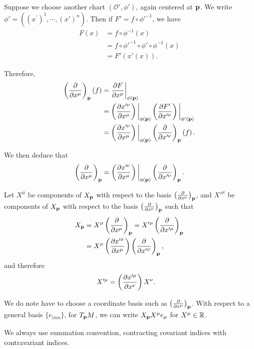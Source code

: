 Suppose we choose another chart $\left( \mathcal{O}', \phi' \right) $, again centered at $\vb{p}$. We write $\phi' = \left(\left( x^{'} \right)^{1}, \cdots, \left( x' \right)^{n}   \right) $. Then if $F' = f \circ \phi'^{-1}$, we have
\begin{align}
    F \left( x \right) &= f \circ \phi^{-1}\left( x \right) \\
    &= f \circ \phi'^{-1} \circ \phi'\circ \phi^{-1} \left( x \right) \\
    &= F' \left( x' \left( x \right)  \right)
.\end{align}

Therefore,
\begin{align}
    \left( \pdv{x^{\mu}} \right)_{\vb{p}} \left( f \right) &=  \pdv{F}{x^{\mu}} \bigg|_{\phi \left( \vb{p} \right) }\\
    &= \left( \pdv{x'^{\nu}}{x^{\mu}} \right) \bigg|_{\phi \left( \vb{p} \right) }  \left( \pdv{F'}{x'^{\nu}} \right) \bigg|_{\phi' \left( \vb{p} \right) } \\
    &= \left( \pdv{x'^{\nu}}{x^{\mu}} \right)  \bigg|_{\phi \left( \vb{p} \right) } \left( \pdv{x'^{\nu}} \right)_{\vb{p}} \left( f \right)
.\end{align}

We then deduce that
\begin{align}
    \left( \pdv{x^{\mu}} \right)_{\vb{p}} = \left( \pdv{x'^{\nu}}{x^{\mu}} \right) \bigg|_{\phi \left( \vb{p} \right) } \left( \pdv{x'^{\nu}} \right)_{\vb{p}} 
.\end{align}

Let $X^{\mu}$ be components of $X_{\vb{p}}$ with respect to the basis $\left( \pdv{x^{\mu}} \right)_{\vb{p}}$, and $X'^{\mu}$ be components of $X_{\vb{p}}$ with respect to the basis $\left( \pdv{x^{\mu}} \right)_{\vb{p}} $ such that
\begin{align}
    X_{\vb{p}} &= X^{\mu} \left( \pdv{x^{\mu}} \right)_{\vb{p}}  = X'^{\mu} \left( \pdv{x'^{\mu}} \right)_{\vb{p}} \\
    &= X^{\mu} \left( \pdv{x'^{\sigma}}{x^{\mu}} \right) \left( \pdv{x'^{\sigma}} \right)_{\vb{p}}
,\end{align}
and therefore
\begin{align}
    X'^{\mu} &= \left( \pdv{x'^{\mu}}{x^{\nu}} \right) X^{\nu}
.\end{align}

\begin{note}
    We do note have to choose a coordinate basis such as $\left( \pdv{x^{\mu}} \right)_{\vb{p}}$. With respect to a general basis $\{e_{|mu}\} $, for $T_{\vb{p}}M$, we can write $X_{\vb{p}} X^{\mu} e_{\mu}$ for $X^{\mu} \in \mathbb{R}$.

    We always use summation convention, contracting covariant indices with contravariant indices.
\end{note}

